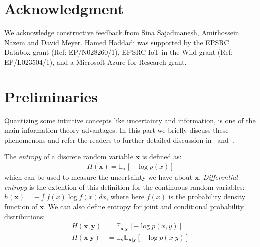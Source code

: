 \documentclass[10pt,journal,compsoc]{IEEEtran}
\begin{document}
  \section*{Acknowledgment}
\fi

We acknowledge constructive feedback from Sina Sajadmanesh, Amirhossein Nazem and David Meyer. Hamed Haddadi was supported by the EPSRC Databox grant (Ref: EP/N028260/1), EPSRC IoT-in-the-Wild grant (Ref: EP/L023504/1), and a Microsoft Azure for Research grant. 



\ifCLASSOPTIONcaptionsoff
  \newpage
\fi








\appendices\section{Preliminaries}\label{appendix:A}

Quantizing some intuitive concepts like uncertainty and information, is one of the main information theory advantages. In this part we briefly discuss these phenomenons and refer the readers to further detailed discussion in~\cite{cover2012} and~\cite{haykin2009}.

The \emph{entropy} of a discrete random variable $\textbf{x}$ is defined as:
\begin{align*}
H(\textbf{x}) = \mathds{E}_\textbf{x}  [-\log p(x)]
\end{align*} 
which can be used to measure the uncertainty we have about $\textbf{x}$. \emph{Differential entropy} is the extention of this definition for the continuous random variables: $h(\textbf{x}) = -\int f(x) \log f(x) dx$, where here $f(x)$ is the probability density function of $\textbf{x}$. We can also define entropy for joint and conditional probability distributions:
\begin{align*}
H(\textbf{x},\textbf{y}) &= \mathds{E}_{\textbf{x},\textbf{y}}  [-\log p(x,y)] \\
H(\textbf{x}|\textbf{y}) &= \mathds{E}_{\textbf{y}} \mathds{E}_{\textbf{x}|\textbf{y}}  [-\log p(x|y)] 
\end{align*}
\end{document}
